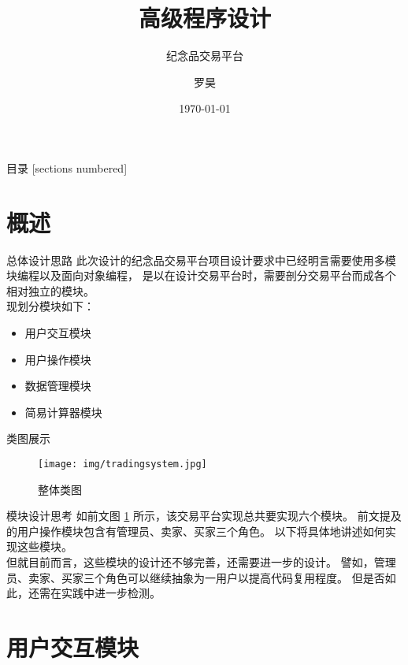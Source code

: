 \documentclass[10pt]{beamer}
\title{高级程序设计}
\subtitle{纪念品交易平台}
\date{\today}
\author{罗昊}
\institute{计算机科学与技术系 191220073}
\begin{document}
\maketitle

\begin{frame}{目录}
    [sections numbered]
    \tableofcontents[hideallsubsections]
\end{frame}

\section{概述}

\begin{frame}{总体设计思路}
    此次设计的纪念品交易平台项目设计要求中已经明言需要使用多模块编程以及面向对象编程，
    是以在设计交易平台时，需要剖分交易平台而成各个相对独立的模块。\\
    现划分模块如下：\\
    \begin{itemize}
        \item 用户交互模块
        \item 用户操作模块
        \item 数据管理模块
        \item 简易计算器模块
    \end{itemize}
\end{frame}

\begin{frame}{类图展示}
    \begin{figure}[H]
        \centering
        \texttt{[image: img/tradingsystem.jpg]}
        \caption{整体类图}
        \label{UmlClass}
    \end{figure}
\end{frame}

\begin{frame}{模块设计思考}
    如前文图 \ref{UmlClass} 所示，该交易平台实现总共要实现六个模块。
    前文提及的用户操作模块包含有管理员、卖家、买家三个角色。
    以下将具体地讲述如何实现这些模块。\\
    但就目前而言，这些模块的设计还不够完善，还需要进一步的设计。
    譬如，管理员、卖家、买家三个角色可以继续抽象为一用户以提高代码复用程度。
    但是否如此，还需在实践中进一步检测。\\
\end{frame}

\section{用户交互模块}
\end{document}
